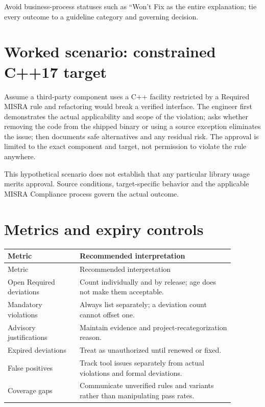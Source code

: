 \documentclass[10pt,letterpaper]{article}
\begin{document}
Avoid business-process statuses such as ``Won't Fix as the entire explanation; tie every outcome to a guideline category and governing decision.


\section{Worked scenario: constrained C++17 target}
Assume a third-party component uses a C++ facility restricted by a Required MISRA rule and refactoring would break a verified interface. The engineer first demonstrates the actual applicability and scope of the violation; asks whether removing the code from the shipped binary or using a source exception eliminates the issue; then documents safe alternatives and any residual risk. The approval is limited to the exact component and target, not permission to violate the rule anywhere.

This hypothetical scenario does not establish that any particular library usage merits approval. Source conditions, target-specific behavior and the applicable MISRA Compliance process govern the actual outcome.


\section{Metrics and expiry controls}
\small\setlength{\tabcolsep}{3pt}\renewcommand{\arraystretch}{1.15}
\begin{longtable}{p{0.28\linewidth}p{0.6\linewidth}}
\toprule
Metric & Recommended interpretation\\ \midrule
\endfirsthead
\toprule
Metric & Recommended interpretation\\ \midrule
\endhead
Open Required deviations & Count individually and by release; age does not make them acceptable.\\
Mandatory violations & Always list separately; a deviation count cannot offset one.\\
Advisory justifications & Maintain evidence and project-recategorization reason.\\
Expired deviations & Treat as unauthorized until renewed or fixed.\\
False positives & Track tool issues separately from actual violations and formal deviations.\\
Coverage gaps & Communicate unverified rules and variants rather than manipulating pass rates.\\
\bottomrule
\end{longtable}
\normalsize
\end{document}
